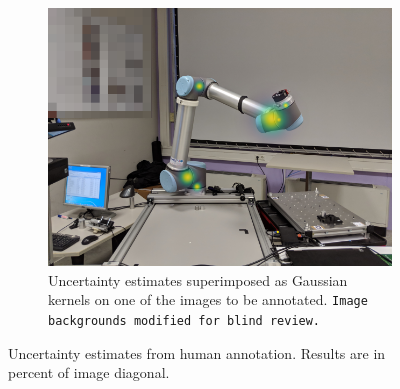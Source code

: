 \documentclass[conference]{IEEEtran}
\begin{document}
\begin{figure}[!h]
\begin{subfigure}[t]{0.49\columnwidth}
            \else
                \includegraphics[width=\columnwidth]{figures/results/human_uncertainty/human_uncertainty_belief_blind.png}
            \fi
            \caption {
                \label{fig:humanuncertainty_belief} 
                Uncertainty estimates superimposed as Gaussian kernels on one of the images to be annotated.
                \iffinalcopy
                \else
                    \texttt{Image backgrounds modified for blind review.}
                \fi
            }
        \end{subfigure}
        \caption {
            \label{fig:uncertainty} 
            Uncertainty estimates from human annotation. Results are in percent of image diagonal.
        }
    \end{figure}
\end{document}
